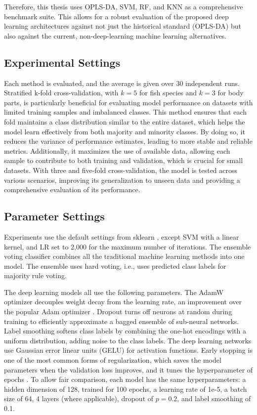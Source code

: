 Therefore, this thesis uses OPLS-DA, SVM, RF, and KNN as a comprehensive benchmark suite. This allows for a robust evaluation of the proposed deep learning architectures against not just the historical standard (OPLS-DA) but also against the current, non-deep-learning machine learning alternatives.

\subsection{Experimental Settings}

Each method is evaluated, and the average is given over 30 independent runs. 
Stratified k-fold cross-validation, with $k=5$ for fish species and $k=3$ for body parts, is particularly beneficial for evaluating model performance on datasets with limited training samples and imbalanced classes. This method ensures that each fold maintains a class distribution similar to the entire dataset, which helps the model learn effectively from both majority and minority classes. By doing so, it reduces the variance of performance estimates, leading to more stable and reliable metrics. Additionally, it maximizes the use of available data, allowing each sample to contribute to both training and validation, which is crucial for small datasets. With three and five-fold cross-validation, the model is tested across various scenarios, improving its generalization to unseen data and providing a comprehensive evaluation of its performance.

\subsection{Parameter Settings}

Experiments use the default settings from sklearn \citep{Pedregosa2011}, except SVM with a linear kernel, and LR set to 2,000 for the maximum number of iterations. 
The ensemble voting classifier combines all the traditional machine learning methods into one model. The ensemble uses hard voting, i.e., uses predicted class labels for majority rule voting.

The deep learning models all use the following parameters. 
The AdamW optimizer \citep{Loshchilov2017} decouples weight decay from the learning rate, an improvement over the popular Adam optimizer \citep{Kingma2013}.
Dropout \citep{Srivastava2014} turns off neurons at random during training to efficiently approximate a bagged ensemble of sub-neural networks.
Label smoothing \citep{Szegedy2015} softens class labels by combining the one-hot encodings with a uniform distribution, adding noise to the class labels.
The deep learning networks use Gaussian error linear units (GELU) \citep{Hendrycks2016} for activation functions.
Early stopping \citep{Morgan1989} is one of the most common forms of regularization, which saves the model parameters when the validation loss improves, and it tunes the hyperparameter of epochs \citep{Goodfellow2016}.
To allow fair comparison, each model has the same hyperparameters: a hidden dimension of 128, trained for 100 epochs, a learning rate of 1e-5, a batch size of 64, 4 layers (where applicable), dropout of $p=0.2$, and label smoothing of 0.1.

